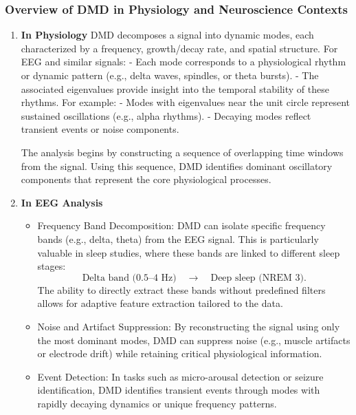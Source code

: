 \documentclass[a4paper,12pt,twoside]{article}
\begin{document}
\subsubsection{Overview of DMD in Physiology and Neuroscience Contexts}
\begin{enumerate}
    \item \textbf{In Physiology}
DMD decomposes a signal into dynamic modes, each characterized by a frequency, growth/decay rate, and spatial structure. For EEG and similar signals:
- Each mode corresponds to a physiological rhythm or dynamic pattern (e.g., delta waves, spindles, or theta bursts).
- The associated eigenvalues provide insight into the temporal stability of these rhythms. For example:
  - Modes with eigenvalues near the unit circle represent sustained oscillations (e.g., alpha rhythms).
  - Decaying modes reflect transient events or noise components.

The analysis begins by constructing a sequence of overlapping time windows from the signal. Using this sequence, DMD identifies dominant oscillatory components that represent the core physiological processes.

\item\textbf{In EEG Analysis}
\begin{itemize}
    \item Frequency Band Decomposition:
   DMD can isolate specific frequency bands (e.g., delta, theta) from the EEG signal. This is particularly valuable in sleep studies, where these bands are linked to different sleep stages:
   \[
   \text{Delta band (0.5–4 Hz)} \quad \rightarrow \quad \text{Deep sleep (NREM 3)}.
   \]
   The ability to directly extract these bands without predefined filters allows for adaptive feature extraction tailored to the data.

\item Noise and Artifact Suppression:
   By reconstructing the signal using only the most dominant modes, DMD can suppress noise (e.g., muscle artifacts or electrode drift) while retaining critical physiological information.

\item Event Detection:
   In tasks such as micro-arousal detection or seizure identification, DMD identifies transient events through modes with rapidly decaying dynamics or unique frequency patterns.
\end{itemize}
\end{enumerate}
\end{document}
